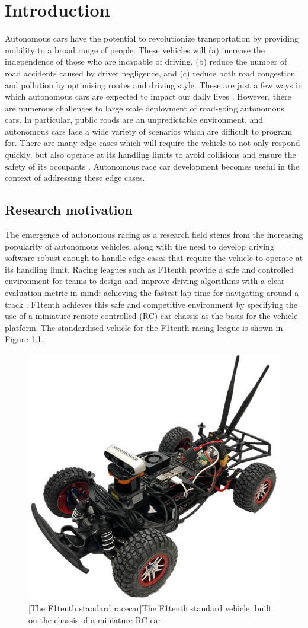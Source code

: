 \chapter{Introduction}
\label{chp:introduction}


Autonomous cars have the potential to revolutionize transportation by providing mobility to a broad range of people. 
These vehicles will (a) increase the independence of those who are incapable of driving, (b) reduce the number of road accidents caused by driver negligence, and (c) reduce both road congestion and pollution by optimising routes and driving style. 
These are just a few ways in which autonomous cars are expected to impact our daily lives \cite{klaver}. 
However, there are numerous challenges to large scale deployment of road-going autonomous cars. 
In particular, public roads are an unpredictable environment, and autonomous cars face a wide variety of scenarios which are difficult to program for.
There are many edge cases which will require the vehicle to not only respond quickly, but also operate at its handling limits to avoid collisions and ensure the safety of its occupants \cite{Barab_s_2017}. 
Autonomous race car development becomes useful in the context of addressing these edge cases.

\section{Research motivation}
The emergence of autonomous racing as a research field stems from the increasing popularity of autonomous vehicles, along with the need to develop driving software robust enough to handle edge cases that require the vehicle to operate at its handling limit.
Racing leagues such as F1tenth \cite{f1tenth} provide a safe and controlled environment for teams to design and improve driving algorithms with a clear evaluation metric in mind: achieving the fastest lap time for navigating around a track \cite{Betz2021}. 
F1tenth achieves this safe and competitive environment by specifying the use of a miniature remote controlled (RC) car chassis as the basis for the vehicle platform. 
The standardised vehicle for the F1tenth racing league is shown in Figure \ref{fig:f1tenth_car}.

\begin{figure}
\centering
  \includegraphics[width=.4\textwidth]{contents/chapt1/figs/f1tenth_car.png}
  [The F1tenth standard racecar]{The F1tenth standard vehicle, built on the chassis of a miniature RC car \cite{f1tenth}.}
  \label{fig:f1tenth_car}
\end{figure}

